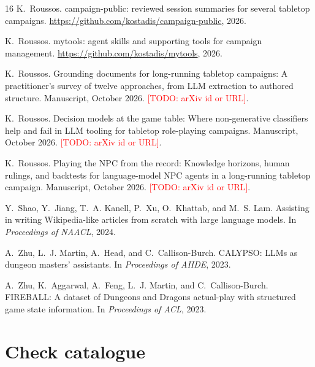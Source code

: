 \documentclass[11pt]{article}
\newcommand{\todo}[1]{\textcolor{red}{[TODO: #1]}}
\begin{document}
\begin{thebibliography}{16}
K.~Roussos.
\newblock campaign-public: reviewed session summaries for several tabletop campaigns.
\newblock \url{https://github.com/kostadis/campaign-public}, 2026.

K.~Roussos.
\newblock mytools: agent skills and supporting tools for campaign management.
\newblock \url{https://github.com/kostadis/mytools}, 2026.

K.~Roussos.
\newblock Grounding documents for long-running tabletop campaigns: A practitioner's
survey of twelve approaches, from LLM extraction to authored structure.
\newblock Manuscript, October 2026. \todo{arXiv id or URL}.

K.~Roussos.
\newblock Decision models at the game table: Where non-generative classifiers help and
fail in LLM tooling for tabletop role-playing campaigns.
\newblock Manuscript, October 2026. \todo{arXiv id or URL}.

K.~Roussos.
\newblock Playing the NPC from the record: Knowledge horizons, human rulings, and
backtests for language-model NPC agents in a long-running tabletop campaign.
\newblock Manuscript, October 2026. \todo{arXiv id or URL}.

Y.~Shao, Y.~Jiang, T.~A. Kanell, P.~Xu, O.~Khattab, and M.~S. Lam.
\newblock Assisting in writing Wikipedia-like articles from scratch with large language
models.
\newblock In \emph{Proceedings of NAACL}, 2024.

A.~Zhu, L.~J. Martin, A.~Head, and C.~Callison-Burch.
\newblock CALYPSO: LLMs as dungeon masters' assistants.
\newblock In \emph{Proceedings of AIIDE}, 2023.

A.~Zhu, K.~Aggarwal, A.~Feng, L.~J. Martin, and C.~Callison-Burch.
\newblock FIREBALL: A dataset of Dungeons and Dragons actual-play with structured game
state information.
\newblock In \emph{Proceedings of ACL}, 2023.

\end{thebibliography}

\appendix

\section{Check catalogue}
\label{app:checks}
\end{document}
